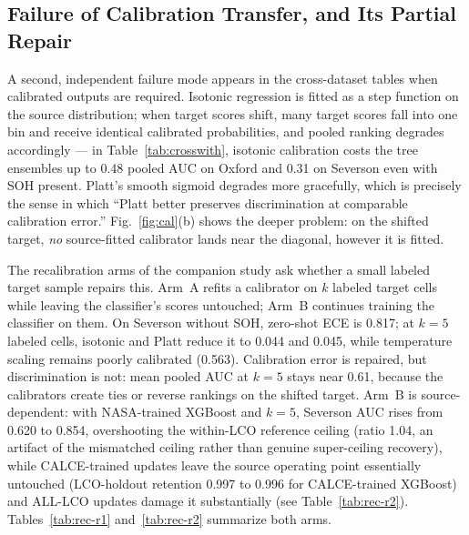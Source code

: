 \documentclass[preprint,12pt]{elsarticle}
\begin{document}
\subsection{Failure of Calibration Transfer, and Its Partial Repair}
A second, independent failure mode appears in the cross-dataset tables when calibrated outputs are required. Isotonic regression is fitted as a step function on the source distribution; when target scores shift, many target scores fall into one bin and receive identical calibrated probabilities, and pooled ranking degrades accordingly --- in Table~\ref{tab:crosswith}, isotonic calibration costs the tree ensembles up to 0.48 pooled AUC on Oxford and 0.31 on Severson even with SOH present. Platt's smooth sigmoid degrades more gracefully, which is precisely the sense in which ``Platt better preserves discrimination at comparable calibration error.'' Fig.~\ref{fig:cal}(b) shows the deeper problem: on the shifted target, \emph{no} source-fitted calibrator lands near the diagonal, however it is fitted.

The recalibration arms of the companion study \cite{shikdar2026robustness} ask whether a small labeled target sample repairs this. Arm~A refits a calibrator on $k$ labeled target cells while leaving the classifier's scores untouched; Arm~B continues training the classifier on them. On Severson without SOH, zero-shot ECE is 0.817; at $k{=}5$ labeled cells, isotonic and Platt reduce it to 0.044 and 0.045, while temperature scaling remains poorly calibrated (0.563). Calibration error is repaired, but discrimination is not: mean pooled AUC at $k{=}5$ stays near 0.61, because the calibrators create ties or reverse rankings on the shifted target. Arm~B is source-dependent: with NASA-trained XGBoost and $k{=}5$, Severson AUC rises from 0.620 to 0.854, overshooting the within-LCO reference ceiling (ratio 1.04, an artifact of the mismatched ceiling rather than genuine super-ceiling recovery), while CALCE-trained updates leave the source operating point essentially untouched (LCO-holdout retention 0.997 to 0.996 for CALCE-trained XGBoost) and ALL-LCO updates damage it substantially (see Table~\ref{tab:rec-r2}). Tables~\ref{tab:rec-r1} and~\ref{tab:rec-r2} summarize both arms.
\end{document}
